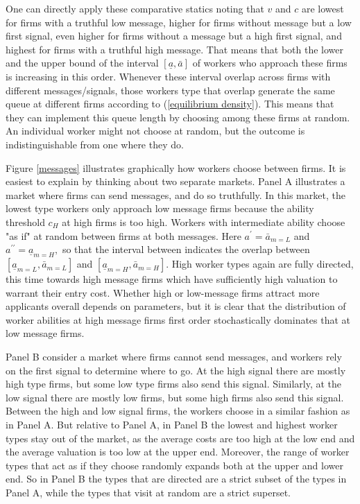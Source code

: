 \documentclass[12pt]{article}
\theoremstyle{plain}
\begin{document}
\bigskip

One can directly apply these comparative statics noting that $v$ and $c$ are
lowest for firms with a truthful low message, higher for firms without
message but a low first signal, even higher for firms without a message but
a high first signal, and highest for firms with a truthful high message.
That means that both the lower and the upper bound of the interval $[%
\underline{a},\bar{a}]$ of workers who approach these firms is increasing in
this order. Whenever these interval overlap across firms with different
messages/signals, those workers type that overlap generate the same queue at
different firms according to (\ref{equilibrium density}). This means that
they can implement this queue length by choosing among these firms at
random. An individual worker might not choose at random, but the outcome is
indistinguishable from one where they do.

Figure \ref{messages} illustrates graphically how workers choose between
firms. It is easiest to explain by thinking about two separate markets.
Panel A illustrates a market where firms can send messages, and do so
truthfully. In this market, the lowest type workers only approach low
message firms because the ability threshold $c_{H}$ at high firms is too
high. Workers with intermediate ability choose "as if" at random between
firms at both messages. Here $a^{\prime }=\bar{a}_{m=L}$ and $a^{\prime
\prime }=\underline{a}_{m=H},$ so that the interval between indicates the
overlap between $[\underline{a}_{m=L},\bar{a}_{m=L}]$ and $[\underline{a}%
_{m=H},\bar{a}_{m=H}]$. High worker types again are fully directed, this
time towards high message firms which have sufficiently high valuation to
warrant their entry cost. Whether high or low-message firms attract more
applicants overall depends on parameters, but it is clear that the
distribution of worker abilities at high message firms first order
stochastically dominates that at low message firms.

Panel B consider a market where firms cannot send messages, and workers rely
on the first signal to determine where to go. At the high signal there are
mostly high type firms, but some low type firms also send this signal.
Similarly, at the low signal there are mostly low firms, but some high firms
also send this signal. Between the high and low signal firms, the workers
choose in a similar fashion as in Panel A. But relative to Panel A, in Panel
B the lowest and highest worker types stay out of the market, as the average
costs are too high at the low end and the average valuation is too low at
the upper end. Moreover, the range of worker types that act as if they
choose randomly expands both at the upper and lower end. So in Panel B the
types that are directed are a strict subset of the types in Panel A, while
the types that visit at random are a strict superset.
\end{document}
